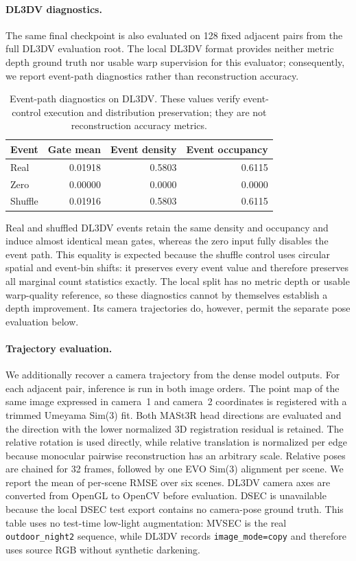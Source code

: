 \paragraph{DL3DV diagnostics.}
The same final checkpoint is also evaluated on 128 fixed adjacent pairs from
the full DL3DV evaluation root.  The local DL3DV format provides neither metric
depth ground truth nor usable warp supervision for this evaluator; consequently,
we report event-path diagnostics rather than reconstruction accuracy.

\begin{table}[h]
\centering
\caption{Event-path diagnostics on DL3DV.  These values verify event-control
execution and distribution preservation; they are not reconstruction accuracy
metrics.}
\label{tab:event-control-dl3dv}
\begin{tabular}{lrrr}
\toprule
Event & Gate mean & Event density & Event occupancy \\
\midrule
Real & 0.01918 & 0.5803 & 0.6115 \\
Zero & 0.00000 & 0.0000 & 0.0000 \\
Shuffle & 0.01916 & 0.5803 & 0.6115 \\
\bottomrule
\end{tabular}
\end{table}

Real and shuffled DL3DV events retain the same density and occupancy and induce
almost identical mean gates, whereas the zero input fully disables the event
path.  This equality is expected because the shuffle control uses circular
spatial and event-bin shifts: it preserves every event value and therefore
preserves all marginal count statistics exactly.  The local split has no metric
depth or usable warp-quality reference, so these diagnostics cannot by
themselves establish a depth improvement.  Its camera trajectories do, however,
permit the separate pose evaluation below.

\paragraph{Trajectory evaluation.}
We additionally recover a camera trajectory from the dense model outputs.  For
each adjacent pair, inference is run in both image orders.  The point map of the
same image expressed in camera~1 and camera~2 coordinates is registered with a
trimmed Umeyama Sim(3) fit.  Both MASt3R head directions are evaluated and the
direction with the lower normalized 3D registration residual is retained.  The
relative rotation is used directly, while relative translation is normalized
per edge because monocular pairwise reconstruction has an arbitrary scale.
Relative poses are chained for 32 frames, followed by one EVO Sim(3) alignment
per scene.  We report the mean of per-scene RMSE over six scenes.  DL3DV camera
axes are converted from OpenGL to OpenCV before evaluation.  DSEC is unavailable
because the local DSEC test export contains no camera-pose ground truth.
This table uses no test-time low-light augmentation: MVSEC is the real
\texttt{outdoor\_night2} sequence, while DL3DV records
\texttt{image\_mode=copy} and therefore uses source RGB without synthetic
darkening.


